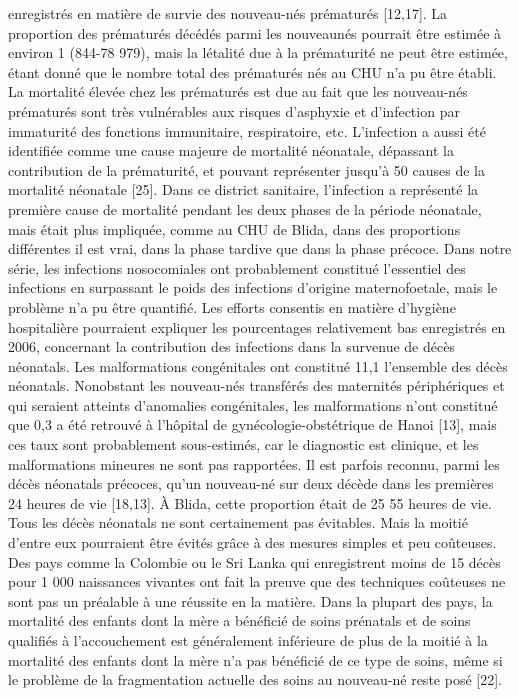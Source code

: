 enregistrés en matière de survie des nouveau-nés prématurés
[12,17].
La proportion des prématurés décédés parmi les nouveaunés
pourrait être estimée à environ 1 %
(844-78 979), mais la létalité due à la prématurité ne peut être
estimée, étant donné que le nombre total des prématurés nés
au CHU n’a pu être établi. La mortalité élevée chez les
prématurés est due au fait que les nouveau-nés prématurés
sont très vulnérables aux risques d’asphyxie et d’infection
par immaturité des fonctions immunitaire, respiratoire, etc.
L’infection a aussi été identifiée comme une cause
majeure de mortalité néonatale, dépassant la contribution
de la prématurité, et pouvant représenter jusqu’à 50 %
causes de la mortalité néonatale [25]. Dans ce district
sanitaire, l’infection a représenté la première cause de
mortalité pendant les deux phases de la période néonatale,
mais était plus impliquée, comme au CHU de Blida, dans des
proportions différentes il est vrai, dans la phase tardive que
dans la phase précoce. Dans notre série, les infections
nosocomiales ont probablement constitué l’essentiel des
infections en surpassant le poids des infections d’origine
maternofoetale, mais le problème n’a pu être quantifié. Les
efforts consentis en matière d’hygiène hospitalière pourraient
expliquer les pourcentages relativement bas enregistrés en
2006, concernant la contribution des infections dans la
survenue de décès néonatals.
Les malformations congénitales ont constitué 11,1 %
l’ensemble des décès néonatals. Nonobstant les nouveau-nés
transférés des maternités périphériques et qui seraient
atteints d’anomalies congénitales, les malformations n’ont
constitué que 0,3 %
a été retrouvé à l’hôpital de gynécologie-obstétrique de
Hanoi [13], mais ces taux sont probablement sous-estimés,
car le diagnostic est clinique, et les malformations mineures
ne sont pas rapportées. Il est parfois reconnu, parmi les
décès néonatals précoces, qu’un nouveau-né sur deux
décède dans les premières 24 heures de vie [18,13]. À
Blida, cette proportion était de 25 %
55 %
heures de vie.
Tous les décès néonatals ne sont certainement pas
évitables. Mais la moitié d’entre eux pourraient être évités
grâce à des mesures simples et peu coûteuses. Des pays
comme la Colombie ou le Sri Lanka qui enregistrent moins
de 15 décès pour 1 000 naissances vivantes ont fait la preuve
que des techniques coûteuses ne sont pas un préalable à une
réussite en la matière. Dans la plupart des pays, la mortalité
des enfants dont la mère a bénéficié de soins prénatals et de
soins qualifiés à l’accouchement est généralement inférieure
de plus de la moitié à la mortalité des enfants dont la mère n’a
pas bénéficié de ce type de soins, même si le problème de
la fragmentation actuelle des soins au nouveau-né reste
posé [22].
	